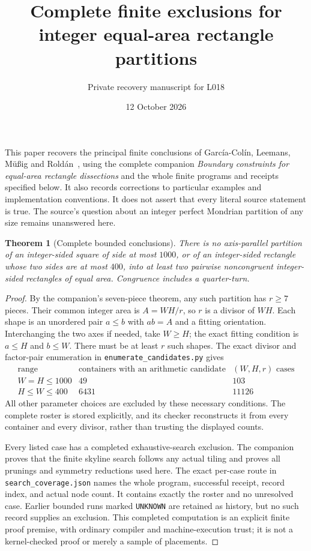 \documentclass[11pt]{article}
\title{Complete finite exclusions for integer equal-area rectangle partitions}
\author{Private recovery manuscript for L018}\date{12 October 2026}
\newtheorem{theorem}{Theorem}
\begin{document}
\maketitle
This paper recovers the principal finite conclusions of Garc\'ia-Col\'in,
Leemans, M\"u\ss ig and Rold\'an~\cite{source}, using the complete companion
\emph{Boundary constraints for equal-area rectangle dissections} and the whole
finite programs and receipts specified below. It also records corrections to
particular examples and implementation conventions. It does not assert that
every literal source statement is true. The source's question about an integer
perfect Mondrian partition of any size remains unanswered here.

\begin{theorem}[Complete bounded conclusions]
There is no axis-parallel partition of an integer-sided square of side at most
$1000$, or of an integer-sided rectangle whose two sides are at most $400$,
into at least two pairwise noncongruent integer-sided rectangles of equal area.
Congruence includes a quarter-turn.
\end{theorem}
\begin{proof}
By the companion's seven-piece theorem, any such partition has $r\ge7$ pieces.
Their common integer area is $A=WH/r$, so $r$ is a divisor of $WH$. Each shape
is an unordered pair $a\le b$ with $ab=A$ and a fitting orientation. Interchanging
the two axes if needed, take $W\ge H$; the exact fitting condition is $a\le H$
and $b\le W$. There must be at least $r$ such shapes. The exact divisor and
factor-pair enumeration in \texttt{enumerate\_candidates.py} gives
\[
\begin{array}{c|r|r}
\text{range}&\text{containers with an arithmetic candidate}&(W,H,r)\text{ cases}\\\hline
W=H\le1000&49&103\\
H\le W\le400&6431&11126
\end{array}
\]
All other parameter choices are excluded by these necessary conditions.
The complete roster is stored explicitly, and its checker reconstructs it
from every container and every divisor, rather than trusting the displayed counts.

Every listed case has a completed exhaustive-search exclusion. The companion
proves that the finite skyline search follows any actual tiling and proves all
prunings and symmetry reductions used here. The exact per-case route in
\texttt{search\_coverage.json} names the whole program, successful receipt,
record index, and actual node count. It contains exactly the roster and no
unresolved case. Earlier bounded runs marked \texttt{UNKNOWN} are retained as
history, but no such record supplies an exclusion. This completed computation
is an explicit finite proof premise, with ordinary compiler and machine-execution
trust; it is not a kernel-checked proof or merely a sample of placements.
\end{proof}
\end{document}
